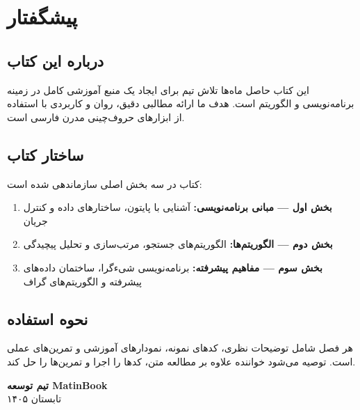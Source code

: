 \documentclass{matinbook}
\begin{document}
\chapter*{پیشگفتار}

\section*{درباره این کتاب}

این کتاب حاصل ماه‌ها تلاش تیم 
برای ایجاد یک منبع آموزشی کامل در زمینه
برنامه‌نویسی و الگوریتم است. هدف ما ارائه
مطالبی دقیق، روان و کاربردی با استفاده از
ابزارهای حروف‌چینی مدرن فارسی است.

\section*{ساختار کتاب}

کتاب در سه بخش اصلی سازماندهی شده است:

\begin{enumerate}
    \item \textbf{بخش اول --- مبانی برنامه‌نویسی:}
    آشنایی با پایتون، ساختارهای داده و کنترل جریان
    
    \item \textbf{بخش دوم --- الگوریتم‌ها:}
    الگوریتم‌های جستجو، مرتب‌سازی و تحلیل پیچیدگی
    
    \item \textbf{بخش سوم --- مفاهیم پیشرفته:}
    برنامه‌نویسی شیءگرا، ساختمان داده‌های پیشرفته
    و الگوریتم‌های گراف
\end{enumerate}

\section*{نحوه استفاده}

هر فصل شامل توضیحات نظری، کدهای نمونه،
نمودارهای آموزشی و تمرین‌های عملی است.
توصیه می‌شود خواننده علاوه بر مطالعه متن،
کدها را اجرا و تمرین‌ها را حل کند.

\vspace{1cm}
\begin{flushleft}
    \textbf{تیم توسعه MatinBook}\\
    تابستان ۱۴۰۵
\end{flushleft}

\clearpage

\tableofcontents
\clearpage
\end{document}
